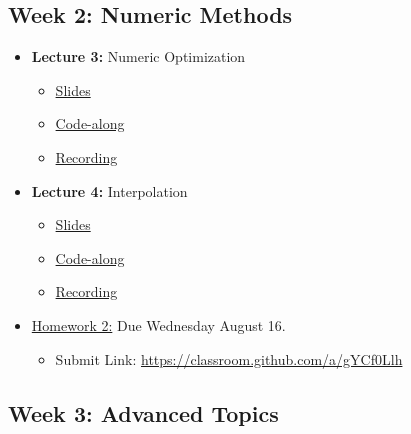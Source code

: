\documentclass[
]{book}
\providecommand{\tightlist}{%
  \setlength{\itemsep}{0pt}\setlength{\parskip}{0pt}}
\begin{document}
\hypertarget{week-2-numeric-methods}{%
\subsection{Week 2: Numeric Methods}\label{week-2-numeric-methods}}

\begin{itemize}
\tightlist
\item
  \textbf{Lecture 3:} Numeric Optimization

  \begin{itemize}
  \tightlist
  \item
    \href{https://kevinghunt.github.io/ComputationCamp/lectures/Lecture3.html}{Slides}
  \item
    \href{https://kevinghunt.github.io/ComputationCamp/codealongs/CodeAlong3.jl}{Code-along}
  \item
    \href{https://uwmadison.zoom.us/rec/share/xD1LsrLsUF8XtJUjPTVDA_2d52EKgQTF1a6Dc3lBOSB7JlRk4PMUi_h0oMRnMtb5.VW6mJ7BkoiC6riUk}{Recording}
  \end{itemize}
\item
  \textbf{Lecture 4:} Interpolation

  \begin{itemize}
  \tightlist
  \item
    \href{https://kevinghunt.github.io/ComputationCamp/lectures/Lecture4.html}{Slides}
  \item
    \href{https://kevinghunt.github.io/ComputationCamp/codealongs/CodeAlong4.jl}{Code-along}
  \item
    \href{https://uwmadison.zoom.us/rec/share/YNnLYBVpnTSQsMTHQGDDWx2n89gURdYXzVWM8dRyV4o91bAfmCkC8q1IT3f-jo3B.msXmwKB-ZcXcIZRL}{Recording}
  \end{itemize}
\item
  \href{https://kevinghunt.github.io/ComputationCamp/homeworks/homework2.html}{Homework 2:} Due Wednesday August 16.

  \begin{itemize}
  \tightlist
  \item
    Submit Link: \url{https://classroom.github.com/a/gYCf0Llh}
  \end{itemize}
\end{itemize}

\hypertarget{week-3-advanced-topics}{%
\subsection{Week 3: Advanced Topics}\label{week-3-advanced-topics}}
\end{document}
